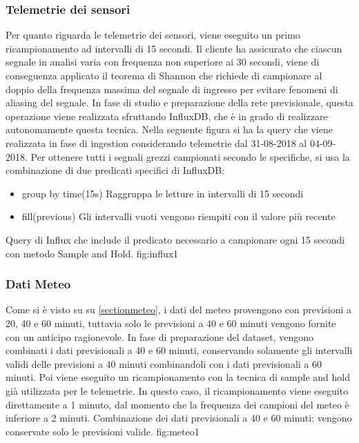 \subsubsection{Telemetrie dei sensori}
Per quanto riguarda le telemetrie dei sensori, viene eseguito un primo ricampionamento ad intervalli di 15 secondi. Il cliente ha assicurato che ciascun segnale in analisi varia con frequenza non superiore ai 30 secondi, viene di conseguenza applicato il teorema di Shannon \cite{calandrino_chiani_2002} che richiede di campionare al doppio della frequenza massima del segnale di ingresso per evitare fenomeni di aliasing del segnale.
In fase di studio e preparazione della rete previsionale, questa operazione viene realizzata sfruttando InfluxDB, che è in grado di realizzare autonomamente questa tecnica. Nella seguente figura si ha la query che viene realizzata in fase di ingestion considerando telemetrie dal 31-08-2018 al 04-09-2018. Per ottenere tutti i segnali grezzi campionati secondo le specifiche, si usa la combinazione di due predicati specifici di InfluxDB:
\begin{itemize}
	\item group by time(15s)
	\subitem Raggruppa le letture in intervalli di 15 secondi
	\item fill(previous)
	\subitem Gli intervalli vuoti vengono riempiti con il valore più recente
\end{itemize}
{Query di Influx che include il predicato necessario a campionare ogni 15 secondi con metodo Sample and Hold. }
{fig:influx1}
\subsubsection{Dati Meteo}
Come si è visto su su \ref{sectionmeteo}, i dati del meteo provengono con previsioni a 20, 40 e 60 minuti, tuttavia solo le previsioni a 40 e 60 minuti vengono fornite con un anticipo ragionevole. In fase di preparazione del dataset, vengono combinati i dati previsionali a 40 e 60 minuti, conservando solamente gli intervalli validi delle previsioni a 40 minuti combinandoli con i dati previsionali a 60 minuti. Poi viene eseguito un ricampionamento con la tecnica di sample and hold già utilizzata per le telemetrie. In questo caso, il ricampionamento viene eseguito direttamente a 1 minuto, dal momento che la frequenza dei campioni del meteo è inferiore a 2 minuti.
{Combinazione dei dati previsionali a 40 e 60 minuti: vengono conservate solo le previsioni valide. }
{fig:meteo1}
